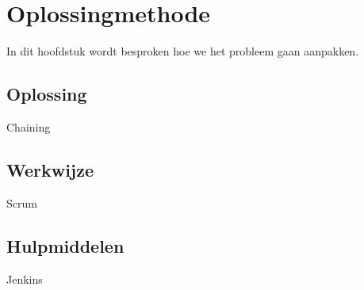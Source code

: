 \section{Oplossingmethode}
In dit hoofdstuk wordt besproken hoe we het probleem gaan aanpakken. 

\subsection{Oplossing}
Chaining

\subsection{Werkwijze}
Scrum

\subsection{Hulpmiddelen}
Jenkins
